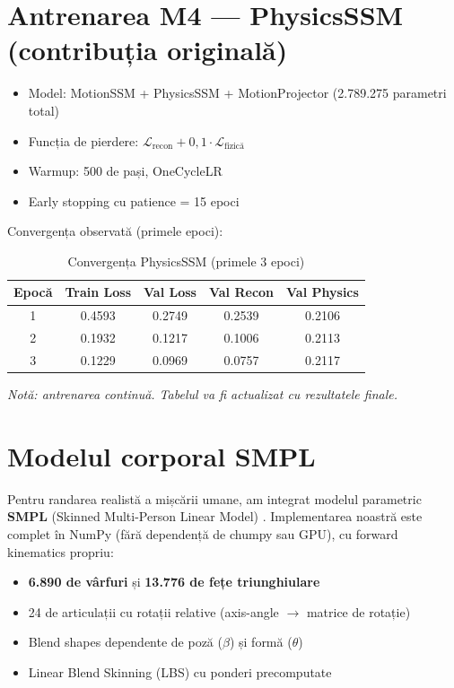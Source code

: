 \section{Antrenarea M4 --- PhysicsSSM (contribuția originală)}

\begin{itemize}
    \item Model: MotionSSM + PhysicsSSM + MotionProjector (2.789.275 parametri total)
    \item Funcția de pierdere: $\mathcal{L}_{\text{recon}} + 0{,}1 \cdot \mathcal{L}_{\text{fizică}}$
    \item Warmup: 500 de pași, OneCycleLR
    \item Early stopping cu patience = 15 epoci
\end{itemize}

Convergența observată (primele epoci):

\begin{table}[h]
\centering
\begin{tabular}{c c c c c}
\hline
\textbf{Epocă} & \textbf{Train Loss} & \textbf{Val Loss} & \textbf{Val Recon} & \textbf{Val Physics} \\
\hline
1  & 0.4593 & 0.2749 & 0.2539 & 0.2106 \\
2  & 0.1932 & 0.1217 & 0.1006 & 0.2113 \\
3  & 0.1229 & 0.0969 & 0.0757 & 0.2117 \\
\hline
\end{tabular}
\caption{Convergența PhysicsSSM (primele 3 epoci)}
\label{tab:physics_ssm_convergence}
\end{table}

\textit{Notă: antrenarea continuă. Tabelul va fi actualizat cu rezultatele finale.}

\section{Modelul corporal SMPL}

Pentru randarea realistă a mișcării umane, am integrat modelul parametric \textbf{SMPL} (Skinned Multi-Person Linear Model) \cite{loper2015smpl}.  Implementarea noastră este complet în NumPy (fără dependență de chumpy sau GPU), cu forward kinematics propriu:

\begin{itemize}
    \item \textbf{6.890 de vârfuri} și \textbf{13.776 de fețe triunghiulare}
    \item 24 de articulații cu rotații relative (axis-angle $\rightarrow$ matrice de rotație)
    \item Blend shapes dependente de poză ($\beta$) și formă ($\theta$)
    \item Linear Blend Skinning (LBS) cu ponderi precomputate
\end{itemize}

